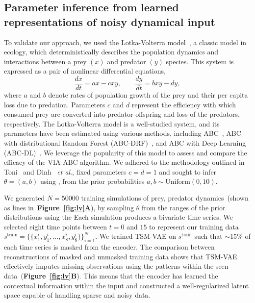 \documentclass[12pt]{article} %
\newcommand{\etal}{\textit{et al}}
\newcommand{\blue}[1]{{\color{magenta}{#1}}}
\begin{document}
\subsection*{Parameter inference from learned representations of noisy dynamical input
}
To validate our approach, we used the Lotka-Volterra model~\citep{lotka1925elements}\citep{volterra1928variations}, a classic model in ecology, which deterministically describes the population dynamics and  interactions between a prey $(x)$ and predator $(y)$ species.
This system is expressed as a pair of nonlinear differential equations,
\begin{equation}
\frac{dx}{dt} = a x - cxy, \qquad
\frac{dy}{dt} = b xy - dy,
\end{equation}
where $a$ and  $b$ denote rates of population growth of the prey and their per capita loss due to predation.
Parameters $c$ and $d$ represent the efficiency with which consumed prey are converted into predator offspring and loss of the predators, respectively.
The Lotka-Volterra model is a well-studied system, and its parameters have been estimated using various methods, including ABC~\citep{toni2009approximate, prangle2017adapting}, ABC with distributional Random Forest (ABC-DRF)~\citep{dinh2024approximate}, and ABC with Deep Learning (ABC-DL)~\citep{Baragatti2024aa}.
We leverage the popularity of this model to assess and compare the efficacy of the VIA-ABC algorithm.
We adhered to the methodology outlined in Toni~\citep{toni2009approximate} and Dinh~\citep{dinh2024approximate} \etal., fixed parameters $c=d=1$  and sought to infer \( \theta = (a, b)\) using , from the prior probabilities  \( a, b \sim \text{Uniform}(0, 10)\).

We generated $N=50000$ training simulations of prey, predator dynamics~(shown as lines in~\textbf{Figure~\ref{fig:lv}A}), by sampling $\theta$ from the ranges of the prior distributions using the \blue{latin hypercube sampler.}  
Each simulation produces a bivariate time series.
We selected eight time points between $t=0$ and $15$ to represent our training data $s^{\mathrm{train}} = \{\{x^i_1, y^i_1, \dots, x^i_8, y^i_8\}\}_{i=1}^{N}$. %
We trained TSM-VAE on $s^{\mathrm{train}}$ such that $\sim 15$\% of each time series is masked from the encoder.
The comparison between reconstructions of masked and unmasked training data shows that TSM-VAE  effectively imputes missing observations using the patterns within the seen data~(\textbf{Figure~\ref{fig:lv}B}). %
This means that the encoder has learned the contextual information within the input and constructed a well-regularized latent space capable of handling sparse and noisy data.
\end{document}
